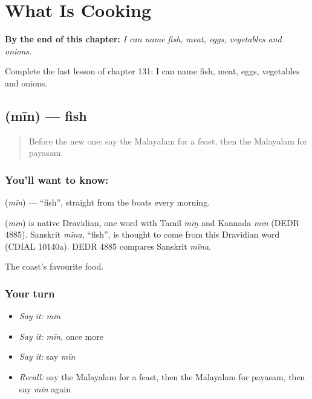 
\chapter{What Is Cooking}
\label{ch:ml-what-is-cooking}

\begin{chapteropening}
\textbf{By the end of this chapter:} \emph{I can name fish, meat, eggs, vegetables and onions.}

Complete the last lesson of chapter 131: I can name fish, meat, eggs, vegetables and onions.
\end{chapteropening}

\section[\texorpdfstring{\ml{മീൻ} (mīn)}{മീൻ (mīn)}]{ (mīn) — fish}

\label{lesson:ML-C131-fish}



\begin{quote}
Before the new one: say the Malayalam for a feast, then the Malayalam for payasam.
\end{quote}

\subsection*{You'll want to know: }
\textbf{} (\emph{mīn}) — \textquotedblleft{}fish\textquotedblright{}, straight from the boats every morning.

\begin{cousinweb}
\textbf{} (\emph{mīn}) is native Dravidian, one word with Tamil \emph{mīṉ} and Kannada \emph{mīn} (DEDR 4885). Sanskrit \emph{mīna}, \textquotedblleft{}fish\textquotedblright{}, is thought to come from this Dravidian word (CDIAL 10140a). DEDR 4885 compares Sanskrit \emph{mīna}.
\end{cousinweb}

\begin{grammarlens}[title={What you've built}]
The coast's favourite food.
\end{grammarlens}

\subsection*{Your turn}
\begin{itemize}
\raggedright
  \item \emph{Say it:} \emph{mīn}
  \item \emph{Say it:} \emph{mīn}, once more
  \item \emph{Say it:} say \emph{mīn}
  \item \emph{Recall:} say the Malayalam for a feast, then the Malayalam for payasam, then say \emph{mīn} again
\end{itemize}

